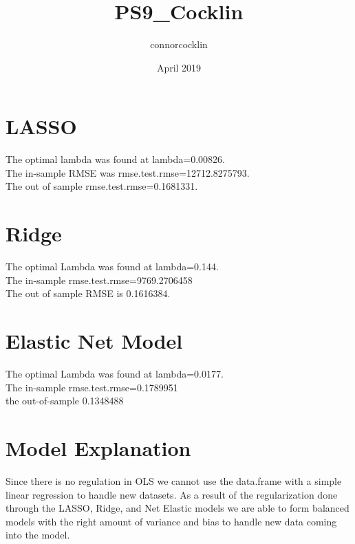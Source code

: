 \documentclass{article}
\title{PS9_Cocklin}
\author{connorcocklin }
\date{April 2019}
\begin{document}
\maketitle

\section{LASSO}
The optimal lambda was found at lambda=0.00826.
\\The in-sample RMSE was rmse.test.rmse=12712.8275793.
\\The out of sample rmse.test.rmse=0.1681331.

\section{Ridge}
The optimal Lambda was found at lambda=0.144.
\\ The in-sample rmse.test.rmse=9769.2706458
\\ The out of sample RMSE is 0.1616384.
\section{Elastic Net Model}
The optimal Lambda was found at lambda=0.0177.
\\ The in-sample rmse.test.rmse=0.1789951
\\ the out-of-sample 0.1348488
\section{Model Explanation}
Since there is no regulation in OLS we cannot use the data.frame with a simple linear regression to handle new datasets. As a result of the regularization done through the LASSO, Ridge, and Net Elastic models we are able to form balanced models with the right amount of variance and bias to handle new data coming into the model.
\end{document}
